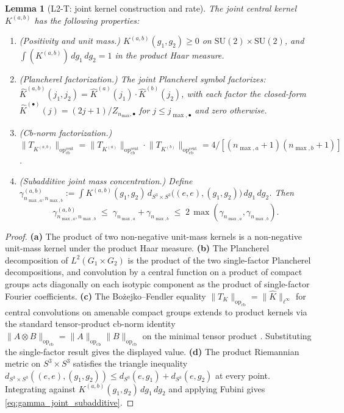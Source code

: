 \documentclass[11pt,a4paper]{article}
\theoremstyle{plain}
\newtheorem{lemma}[theorem]{Lemma}
\theoremstyle{definition}
\newcommand{\nmax}{n_{\max}}
\newcommand{\nmaxa}{n_{\max,a}}
\newcommand{\nmaxb}{n_{\max,b}}
\newcommand{\sthree}{S^{3}}
\newcommand{\opnorm}[1]{\lVert #1 \rVert_{\mathrm{op}}}
\newcommand{\norm}[1]{\lVert #1 \rVert}
\newcommand{\SU}{\mathrm{SU}}
\newcommand{\KS}{K}
\begin{document}
\begin{lemma}[L2-T: joint kernel construction and rate]\label{lem:L2-T}
The joint central kernel $\KS^{(a,b)}$ has the following properties:
\begin{enumerate}\setlength{\itemsep}{2pt}
\item[(a)] (Positivity and unit mass.)
$\KS^{(a,b)}(g_1, g_2) \ge 0$ on $\SU(2) \times \SU(2)$, and
$\int (\KS^{(a,b)})\,dg_1\,dg_2 = 1$ in the product Haar measure.
\item[(b)] (Plancherel factorization.) The joint Plancherel symbol
factorizes:
$\widehat{\KS}^{(a,b)}(j_1, j_2) = \widehat{\KS}^{(a)}(j_1) \cdot
\widehat{\KS}^{(b)}(j_2)$, with each factor the closed-form
$\widehat{\KS}^{(\bullet)}(j) = (2j+1)/Z_{\nmax,\bullet}$ for
$j \le j_{\max,\bullet}$ and zero otherwise.
\item[(c)] (Cb-norm factorization.)
$\opnorm{T_{\KS^{(a,b)}}}_{\mathrm{cb}}^{\mathrm{cent}} =
\opnorm{T_{\KS^{(a)}}}_{\mathrm{cb}}^{\mathrm{cent}} \cdot
\opnorm{T_{\KS^{(b)}}}_{\mathrm{cb}}^{\mathrm{cent}}
= 4 / [(\nmaxa + 1)(\nmaxb + 1)]$.
\item[(d)] (Subadditive joint mass concentration.) Define
$\gamma^{(a,b)}_{\nmaxa, \nmaxb} := \int \KS^{(a,b)}(g_1, g_2)\,
d_{\sthree \times \sthree}\bigl((e,e), (g_1, g_2)\bigr)\,dg_1\,dg_2$.
Then
\begin{equation}\label{eq:gamma_joint_subadditive}
   \gamma^{(a,b)}_{\nmaxa, \nmaxb}
   \;\le\; \gamma_{\nmaxa} + \gamma_{\nmaxb}
   \;\le\; 2\,\max(\gamma_{\nmaxa}, \gamma_{\nmaxb}).
\end{equation}
\end{enumerate}
\end{lemma}

\begin{proof}
\textbf{(a)} The product of two non-negative unit-mass kernels is a
non-negative unit-mass kernel under the product Haar measure.
\textbf{(b)} The Plancherel decomposition of $L^2(G_1 \times G_2)$ is
the product of the two single-factor Plancherel decompositions, and
convolution by a central function on a product of compact groups acts
diagonally on each isotypic component as the product of single-factor
Fourier coefficients.
\textbf{(c)} The Bo{\.z}ejko--Fendler equality
$\opnorm{T_K}_{\mathrm{cb}} = \norm{\widehat{K}}_{\ell^\infty}$ for
central convolutions on amenable compact groups
\cite{bozejko_fendler1991, pisier2003} extends to product kernels via
the standard tensor-product cb-norm identity
$\opnorm{A \otimes B}_{\mathrm{cb}} = \opnorm{A}_{\mathrm{cb}}
\opnorm{B}_{\mathrm{cb}}$ on the minimal tensor product
\cite[Ch.~8]{pisier2003}. Substituting the single-factor result
\cite[Lemma~3.4(c)]{loutey_paper38} gives the displayed value.
\textbf{(d)} The product Riemannian metric on $\sthree \times \sthree$
satisfies the triangle inequality $d_{\sthree \times \sthree}((e,e),
(g_1, g_2)) \le d_{\sthree}(e, g_1) + d_{\sthree}(e, g_2)$ at every
point. Integrating against $\KS^{(a,b)}(g_1, g_2) \,dg_1 \,dg_2$ and
applying Fubini gives \eqref{eq:gamma_joint_subadditive}.
\end{proof}
\end{document}
